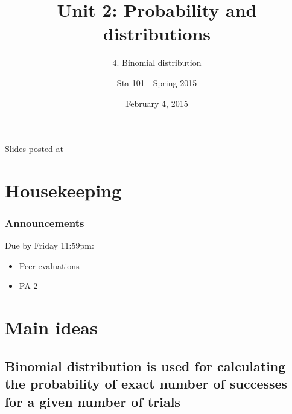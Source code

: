 \documentclass[slidestop,compress,mathserif,12pt,t,professionalfonts,xcolor=table]{beamer}
\title{Unit 2: Probability and distributions}
\subtitle{4. Binomial distribution}
\author{Sta 101 - Spring 2015}
\date{February 4, 2015}
\institute{Duke University, Department of Statistical Science}
\begin{document}



\begin{frame}[plain]

\titlepage
\vfill
{\scriptsize {} \hfill Slides posted at  \webLink{\CourseSite}{\CourseSite}}
\addtocounter{framenumber}{-1} 

\end{frame}


\section{Housekeeping}


\begin{frame}
\frametitle{Announcements}

Due by Friday 11:59pm:
\begin{itemize}

\item Peer evaluations

\item PA 2

\end{itemize}

\end{frame}


\section{Main ideas}


\subsection{Binomial distribution is used for calculating the probability of exact number of successes for a given number of trials}
\label{mi1}

\end{document}
